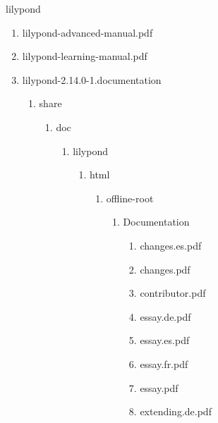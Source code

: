 \documentclass[11pt]{article}
\begin{document}
\item lilypond
\label{sec-1-1-1-1-46-10}
\begin{enumerate}
\item lilypond-advanced-manual.pdf
\label{sec-1-1-1-1-46-10-1}

\item lilypond-learning-manual.pdf
\label{sec-1-1-1-1-46-10-2}

\item lilypond-2.14.0-1.documentation
\label{sec-1-1-1-1-46-10-3}
\begin{enumerate}
\item share
\label{sec-1-1-1-1-46-10-3-1}
\begin{enumerate}
\item doc
\label{sec-1-1-1-1-46-10-3-1-1}
\begin{enumerate}
\item lilypond
\label{sec-1-1-1-1-46-10-3-1-1-1}
\begin{enumerate}
\item html
\label{sec-1-1-1-1-46-10-3-1-1-1-1}
\begin{enumerate}
\item offline-root
\label{sec-1-1-1-1-46-10-3-1-1-1-1-1}
\begin{enumerate}
\item Documentation
\label{sec-1-1-1-1-46-10-3-1-1-1-1-1-1}
\begin{enumerate}
\item changes.es.pdf
\label{sec-1-1-1-1-46-10-3-1-1-1-1-1-1-1}

\item changes.pdf
\label{sec-1-1-1-1-46-10-3-1-1-1-1-1-1-2}

\item contributor.pdf
\label{sec-1-1-1-1-46-10-3-1-1-1-1-1-1-3}

\item essay.de.pdf
\label{sec-1-1-1-1-46-10-3-1-1-1-1-1-1-4}

\item essay.es.pdf
\label{sec-1-1-1-1-46-10-3-1-1-1-1-1-1-5}

\item essay.fr.pdf
\label{sec-1-1-1-1-46-10-3-1-1-1-1-1-1-6}

\item essay.pdf
\label{sec-1-1-1-1-46-10-3-1-1-1-1-1-1-7}

\item extending.de.pdf
\label{sec-1-1-1-1-46-10-3-1-1-1-1-1-1-8}


\end{enumerate}
\end{enumerate}
\end{enumerate}
\end{enumerate}
\end{enumerate}
\end{enumerate}
\end{enumerate}
\end{enumerate}
\end{document}
